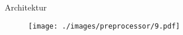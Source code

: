 \begin{frame}{Architektur}
    \begin{figure}
    	\centering
    	\texttt{[image: ./images/preprocessor/9.pdf]}
    \end{figure}
\end{frame}
